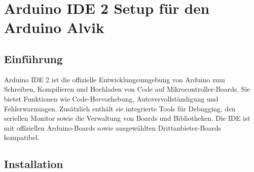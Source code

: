 %
%
%



\chapter{Arduino IDE 2 Setup für den Arduino Alvik} 


\section{Einführung}

Arduino IDE 2 ist die offizielle Entwicklungsumgebung von Arduino zum Schreiben, Kompilieren und Hochladen von Code auf Mikrocontroller-Boards. Sie bietet Funktionen wie Code-Hervorhebung, Autovervollständigung und Fehlerwarnungen. Zusätzlich enthält sie integrierte Tools für Debugging, den seriellen Monitor sowie die Verwaltung von Boards und Bibliotheken. Die IDE ist mit offiziellen Arduino-Boards sowie ausgewählten Drittanbieter-Boards kompatibel.

\section{Installation}

